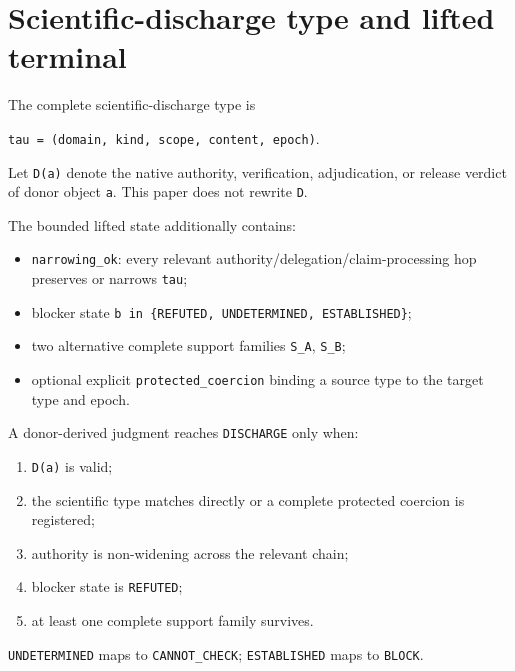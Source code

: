 \section{Scientific-discharge type and lifted terminal}

The complete scientific-discharge type is

\texttt{tau = (domain, kind, scope, content, epoch)}.

Let \texttt{D(a)} denote the native authority, verification, adjudication, or release verdict of donor object \texttt{a}. This paper does not rewrite \texttt{D}.

The bounded lifted state additionally contains:

\begin{itemize}
  \item \texttt{narrowing_ok}: every relevant authority/delegation/claim-processing hop preserves or narrows \texttt{tau};
  \item blocker state \texttt{b in \{REFUTED, UNDETERMINED, ESTABLISHED\}};
  \item two alternative complete support families \texttt{S_A}, \texttt{S_B};
  \item optional explicit \texttt{protected_coercion} binding a source type to the target type and epoch.
\end{itemize}

A donor-derived judgment reaches \texttt{DISCHARGE} only when:

\begin{enumerate}
  \item \texttt{D(a)} is valid;
  \item the scientific type matches directly or a complete protected coercion is registered;
  \item authority is non-widening across the relevant chain;
  \item blocker state is \texttt{REFUTED};
  \item at least one complete support family survives.
\end{enumerate}

\texttt{UNDETERMINED} maps to \texttt{CANNOT_CHECK}; \texttt{ESTABLISHED} maps to \texttt{BLOCK}.
